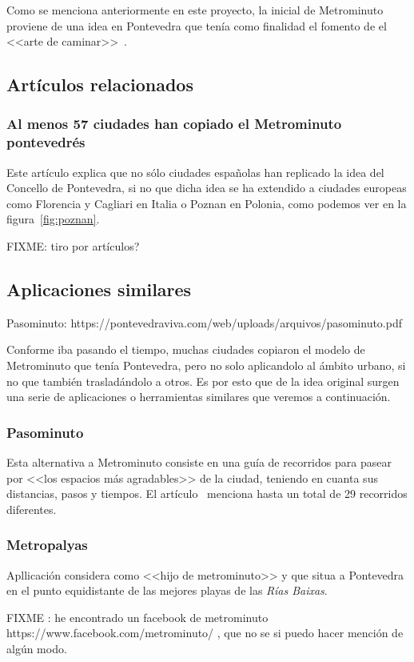 
Como se menciona anteriormente en este proyecto, la inicial de Metrominuto proviene de una idea en Pontevedra que tenía como finalidad el fomento de el <<arte de caminar>>~\cite{wiki:metrominuto-pontevedra}.



\subsection{Artículos relacionados}

\subsubsection{Al menos 57 ciudades han copiado el Metrominuto pontevedrés~\cite{art:metromin-ciudades}}
Este artículo explica que no sólo ciudades españolas han replicado la idea del Concello de Pontevedra, si no que dicha idea se ha extendido a ciudades europeas como Florencia y Cagliari  en Italia o Poznan en Polonia, como podemos ver en la figura~\ref{fig:poznan}.

FIXME: tiro por artículos?


\subsection{Aplicaciones similares}
Pasominuto: https://pontevedraviva.com/web/uploads/arquivos/pasominuto.pdf

Conforme iba pasando el tiempo, muchas ciudades copiaron el modelo de Metrominuto que tenía Pontevedra, pero no solo aplicandolo al ámbito urbano, si no que también trasladándolo a otros. Es por esto que de la idea original surgen una serie de aplicaciones o herramientas similares que veremos a continuación.

\subsubsection{Pasominuto}
Esta alternativa a Metrominuto consiste en una guía de recorridos para pasear por <<los espacios más agradables>> de la ciudad, teniendo en cuanta sus distancias, pasos y tiempos. El artículo~\cite{art:pasominuto} menciona hasta un total de 29 recorridos diferentes.

\subsubsection{Metropalyas}
Apllicación considera como <<hijo de metrominuto>> y que situa a Pontevedra en el punto equidistante de las mejores playas de las \textit{Rías Baixas}.



FIXME : he encontrado un facebook de metrominuto https://www.facebook.com/metrominuto/  , que no se si puedo hacer mención de algún modo.